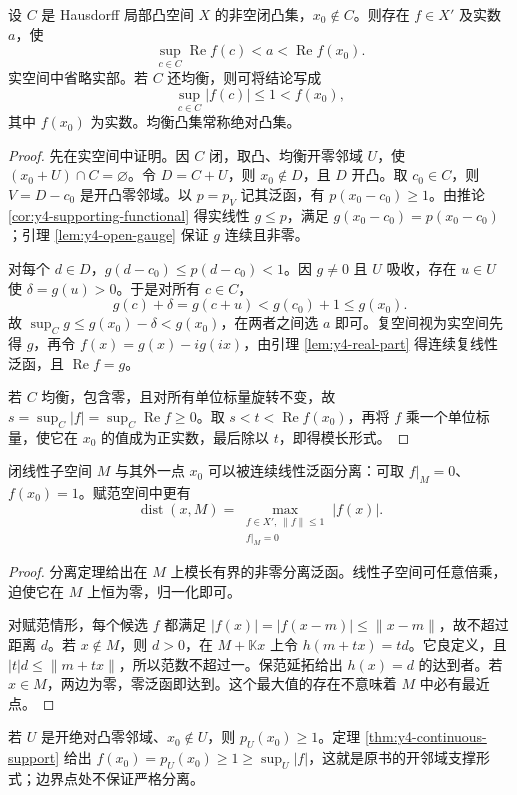 \begin{theorem}[点与闭凸集的严格分离]\label{thm:y4-convex-separation}
设 $C$ 是 Hausdorff 局部凸空间 $X$ 的非空闭凸集，$x_0\notin C$。则存在 $f\in X'$ 及实数 $a$，使
\[
 \sup_{c\in C}\operatorname{Re}f(c)<a<\operatorname{Re}f(x_0).
\]
实空间中省略实部。若 $C$ 还均衡，则可将结论写成
\[
 \sup_{c\in C}|f(c)|\le1<f(x_0),
\]
其中 $f(x_0)$ 为实数。均衡凸集常称绝对凸集。
\end{theorem}
\begin{proof}
先在实空间中证明。因 $C$ 闭，取凸、均衡开零邻域 $U$，使 $(x_0+U)\cap C=\varnothing$。令 $D=C+U$，则 $x_0\notin D$，且 $D$ 开凸。取 $c_0\in C$，则 $V=D-c_0$ 是开凸零邻域。以 $p=p_V$ 记其泛函，有 $p(x_0-c_0)\ge1$。由推论 \ref{cor:y4-supporting-functional} 得实线性 $g\le p$，满足 $g(x_0-c_0)=p(x_0-c_0)$；引理 \ref{lem:y4-open-gauge} 保证 $g$ 连续且非零。

对每个 $d\in D$，$g(d-c_0)\le p(d-c_0)<1$。因 $g\ne0$ 且 $U$ 吸收，存在 $u\in U$ 使 $\delta=g(u)>0$。于是对所有 $c\in C$，
\[
 g(c)+\delta=g(c+u)<g(c_0)+1\le g(x_0).
\]
故 $\sup_Cg\le g(x_0)-\delta<g(x_0)$，在两者之间选 $a$ 即可。复空间视为实空间先得 $g$，再令 $f(x)=g(x)-ig(ix)$，由引理 \ref{lem:y4-real-part} 得连续复线性泛函，且 $\operatorname{Re}f=g$。

若 $C$ 均衡，包含零，且对所有单位标量旋转不变，故
$s=\sup_C|f|=\sup_C\operatorname{Re}f\ge0$。取 $s<t<\operatorname{Re}f(x_0)$，再将 $f$ 乘一个单位标量，使它在 $x_0$ 的值成为正实数，最后除以 $t$，即得模长形式。
\end{proof}

\begin{corollary}[闭子空间与距离]\label{cor:y4-distance-dual}
闭线性子空间 $M$ 与其外一点 $x_0$ 可以被连续线性泛函分离：可取 $f|_M=0$、$f(x_0)=1$。赋范空间中更有
\[
 \operatorname{dist}(x,M)=\max_{\substack{f\in X',\ \|f\|\le1\\ f|_M=0}}|f(x)|.
\]
\end{corollary}
\begin{proof}
分离定理给出在 $M$ 上模长有界的非零分离泛函。线性子空间可任意倍乘，迫使它在 $M$ 上恒为零，归一化即可。

对赋范情形，每个候选 $f$ 都满足 $|f(x)|=|f(x-m)|\le\|x-m\|$，故不超过距离 $d$。若 $x\notin M$，则 $d>0$，在 $M+\mathbb Kx$ 上令 $h(m+tx)=td$。它良定义，且 $|t|d\le\|m+tx\|$，所以范数不超过一。保范延拓给出 $h(x)=d$ 的达到者。若 $x\in M$，两边为零，零泛函即达到。这个最大值的存在不意味着 $M$ 中必有最近点。
\end{proof}

若 $U$ 是开绝对凸零邻域、$x_0\notin U$，则 $p_U(x_0)\ge1$。定理 \ref{thm:y4-continuous-support} 给出 $f(x_0)=p_U(x_0)\ge1\ge\sup_U|f|$，这就是原书的开邻域支撑形式；边界点处不保证严格分离。

